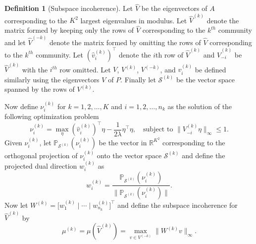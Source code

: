 \documentclass[
  11pt,
]{article}
\theoremstyle{definition}
\newtheorem{definition}{Definition}[section]
\theoremstyle{definition}
\theoremstyle{definition}
\theoremstyle{definition}
\theoremstyle{remark}
\begin{document}
\begin{definition}[Subspace incoherence]
\label{def:subspace_incoherence}
Let $\hat{V}$ be the eigenvectors of $A$
corresponding to the $K^2$ largest eigenvalues in modulus. Let
$\hat{V}^{(k)}$ denote the matrix formed by keeping only the rows of
$\hat{V}$ corresponding to the $k^{th}$
community and let $\hat{V}^{(-k)}$ denote the matrix formed by
omitting the rows of $\hat{V}$
corresponding to the $k^{th}$ community. Let $(\hat{v}_i^{(k)})^\top$ denote
the $i$th row of $\hat{V}^{(k)}$ and $\hat{V}_{-i}^{(k)}$ be $\hat{V}^{(k)}$ with
the $i^{th}$ row omitted. Let $V$, $V^{(k)}$, $V^{(-k)}$, and
$v_i^{(k)}$ be defined similarly using the eigenvectors $V$ of
$P$. Finally let $\mathcal{S}^{(k)}$ be the vector space spanned by the
rows of $V^{(k)}$. 

Now define $\nu_{i}^{(k)}$ for $k = 1,2,\dots,K$ and $i =
1,2,\dots,n_{k}$ as the solution of the following optimization problem
$$\nu_{i}^{(k)} = \max_\eta (\hat{v}_i^{(k)})^\top \eta - \frac{1}{2
  \lambda} \eta^\top \eta, \quad \text{subject to $\|V_{-i}^{(k)}
  \eta\|_\infty \leq 1$.}$$
Given $\nu_i^{(k)}$, let $\mathbb{P}_{\mathcal{S}^{(k)}}(\nu_i^{(k)})$
be the vector in $\mathbb{R}^{K^2}$ corresponding to the orthogonal projection of $\nu_i^{(k)}$ onto the vector space
$\mathcal{S}^{(k)}$ and define the projected dual direction $w_{i}^{(k)}$
as
$$w_i^{(k)} =
\frac{\mathbb{P}_{\mathcal{S}^{(k)}}(\nu_i^{(k)})}{\|\mathbb{P}_{\mathcal{S}^{(k)}}(\nu_i^{(k)})\|}.$$
Now let $W^{(k)} = \bigl[ w_1^{(k)} \mid \cdots \mid w_{n_k}^{(k)} \bigr]^\top$
and define the subspace incoherence for $\hat{V}^{(k)}$ by
$$\mu^{(k)} = \mu(\hat{V}^{(k)}) = \max\limits_{v \in V^{(-k)}} \|W^{(k)} v\|_\infty.$$
\end{definition}
\end{document}
